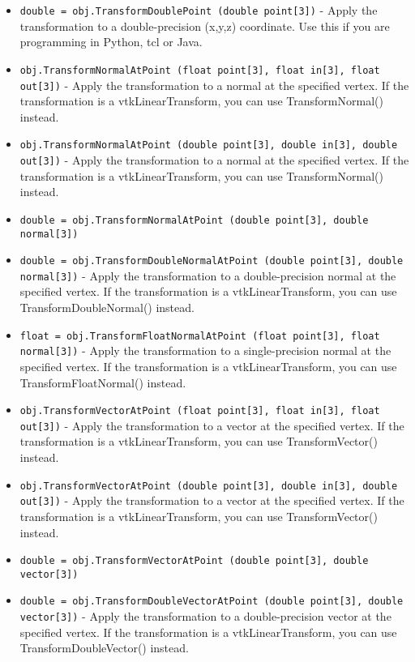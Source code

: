 \begin{itemize}
\item  \verb|double = obj.TransformDoublePoint (double point[3])| -  Apply the transformation to a double-precision (x,y,z) coordinate.
 Use this if you are programming in Python, tcl or Java.

\item  \verb|obj.TransformNormalAtPoint (float point[3], float in[3], float out[3])| -  Apply the transformation to a normal at the specified vertex.  If the
 transformation is a vtkLinearTransform, you can use TransformNormal()
 instead.

\item  \verb|obj.TransformNormalAtPoint (double point[3], double in[3], double out[3])| -  Apply the transformation to a normal at the specified vertex.  If the
 transformation is a vtkLinearTransform, you can use TransformNormal()
 instead.

\item  \verb|double = obj.TransformNormalAtPoint (double point[3], double normal[3])|

\item  \verb|double = obj.TransformDoubleNormalAtPoint (double point[3], double normal[3])| -  Apply the transformation to a double-precision normal at the specified
 vertex.  If the transformation is a vtkLinearTransform, you can use
 TransformDoubleNormal() instead.

\item  \verb|float = obj.TransformFloatNormalAtPoint (float point[3], float normal[3])| -  Apply the transformation to a single-precision normal at the specified
 vertex.  If the transformation is a vtkLinearTransform, you can use
 TransformFloatNormal() instead.

\item  \verb|obj.TransformVectorAtPoint (float point[3], float in[3], float out[3])| -  Apply the transformation to a vector at the specified vertex.  If the
 transformation is a vtkLinearTransform, you can use TransformVector()
 instead.

\item  \verb|obj.TransformVectorAtPoint (double point[3], double in[3], double out[3])| -  Apply the transformation to a vector at the specified vertex.  If the
 transformation is a vtkLinearTransform, you can use TransformVector()
 instead.

\item  \verb|double = obj.TransformVectorAtPoint (double point[3], double vector[3])|

\item  \verb|double = obj.TransformDoubleVectorAtPoint (double point[3], double vector[3])| -  Apply the transformation to a double-precision vector at the specified
 vertex.  If the transformation is a vtkLinearTransform, you can use
 TransformDoubleVector() instead.


\end{itemize}
